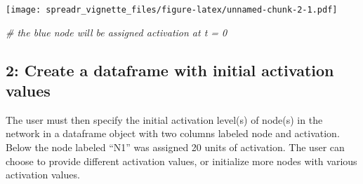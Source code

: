 \documentclass[]{article}
\newenvironment{Shaded}{\begin{snugshade}}{\end{snugshade}}
\newcommand{\KeywordTok}[1]{\textcolor[rgb]{0.13,0.29,0.53}{\textbf{#1}}}
\newcommand{\DataTypeTok}[1]{\textcolor[rgb]{0.13,0.29,0.53}{#1}}
\newcommand{\DecValTok}[1]{\textcolor[rgb]{0.00,0.00,0.81}{#1}}
\newcommand{\FloatTok}[1]{\textcolor[rgb]{0.00,0.00,0.81}{#1}}
\newcommand{\StringTok}[1]{\textcolor[rgb]{0.31,0.60,0.02}{#1}}
\newcommand{\CommentTok}[1]{\textcolor[rgb]{0.56,0.35,0.01}{\textit{#1}}}
\newcommand{\OperatorTok}[1]{\textcolor[rgb]{0.81,0.36,0.00}{\textbf{#1}}}
\newcommand{\NormalTok}[1]{#1}
\begin{document}
\begin{Shaded}
\end{Shaded}

\texttt{[image: spreadr\_vignette\_files/figure-latex/unnamed-chunk-2-1.pdf]}

\begin{Shaded}
\begin{Highlighting}[]
\CommentTok{# the blue node will be assigned activation at t = 0}
\end{Highlighting}
\end{Shaded}

\subsection{2: Create a dataframe with initial activation
values}\label{create-a-dataframe-with-initial-activation-values}

The user must then specify the initial activation level(s) of node(s) in
the network in a dataframe object with two columns labeled node and
activation. Below the node labeled ``N1'' was assigned 20 units of
activation. The user can choose to provide different activation values,
or initialize more nodes with various activation values.
\end{document}
